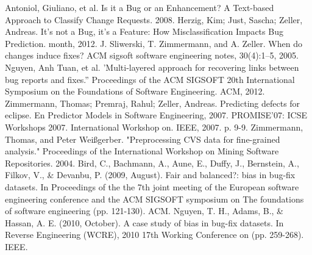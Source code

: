 %
%

%
% 
% 
%
\begin{thebibliography}{99.}
%
%
%

Antoniol, Giuliano, et al. Is it a Bug or an Enhancement? A Text-based Approach to Classify Change Requests. 2008.
Herzig, Kim; Just, Sascha; Zeller, Andreas. It's not a Bug, it's a Feature: How Misclassification Impacts Bug Prediction. month, 2012.
J. Sliwerski, T. Zimmermann, and A. Zeller. When do
changes induce fixes? ACM sigsoft software engineering
notes, 30(4):1–5, 2005.
Nguyen, Anh Tuan, et al. 'Multi-layered approach for recovering links between bug reports and fixes.'' Proceedings of the ACM SIGSOFT 20th International Symposium on the Foundations of Software Engineering. ACM, 2012.
Zimmermann, Thomas; Premraj, Rahul; Zeller, Andreas. Predicting defects for eclipse. En Predictor Models in Software Engineering, 2007. PROMISE'07: ICSE Workshops 2007. International Workshop on. IEEE, 2007. p. 9-9.
Zimmermann, Thomas, and Peter Weißgerber. "Preprocessing CVS data for fine-grained analysis." Proceedings of the International Workshop on Mining Software Repositories. 2004.
Bird, C., Bachmann, A., Aune, E., Duffy, J., Bernstein, A., Filkov, V., \& Devanbu, P. (2009, August). Fair and balanced?: bias in bug-fix datasets. In Proceedings of the the 7th joint meeting of the European software engineering conference and the ACM SIGSOFT symposium on The foundations of software engineering (pp. 121-130). ACM.
Nguyen, T. H., Adams, B., \& Hassan, A. E. (2010, October). A case study of bias in bug-fix datasets. In Reverse Engineering (WCRE), 2010 17th Working Conference on (pp. 259-268). IEEE.





\end{thebibliography}
